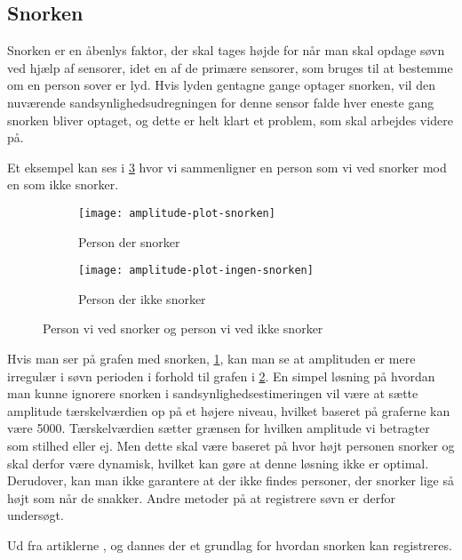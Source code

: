 \subsection{Snorken}\label{section:snorken}
Snorken er en åbenlys faktor, der skal tages højde for når man skal opdage søvn ved hjælp af sensorer, idet en af de primære sensorer, som bruges til at bestemme om en person sover er lyd.
Hvis lyden gentagne gange optager snorken, vil den nuværende sandsynlighedsudregningen for denne sensor falde hver eneste gang snorken bliver optaget, og dette er helt klart et problem, som skal arbejdes videre på.

Et eksempel kan ses i \cref{fig:snorke-vs-ikkesnorken} hvor vi sammenligner en person som vi ved snorker mod en som ikke snorker.

\begin{figure}[h]
\begin{subfigure}{0.49\textwidth}
\texttt{[image: amplitude-plot-snorken]}
\caption{Person der snorker}
\label{fig:person-snorker}
\end{subfigure}
\begin{subfigure}{0.49\textwidth}
\texttt{[image: amplitude-plot-ingen-snorken]}
\caption{Person der ikke snorker}
\label{fig:person-ikke-snorker}
\end{subfigure}
\caption{Person vi ved snorker og person vi ved ikke snorker}
\label{fig:snorke-vs-ikkesnorken}
\end{figure}

Hvis man ser på grafen med snorken, \cref{fig:person-snorker}, kan man se at amplituden er mere irregulær i søvn perioden i forhold til grafen i \cref{fig:person-ikke-snorker}. 
En simpel løsning på hvordan man kunne ignorere snorken i sandsynlighedsestimeringen vil være at sætte amplitude tærskelværdien op på et højere niveau, hvilket baseret på graferne kan være 5000. 
Tærskelværdien sætter grænsen for hvilken amplitude vi betragter som stilhed eller ej.
Men dette skal være baseret på hvor højt personen snorker og skal derfor være dynamisk, hvilket kan gøre at denne løsning ikke er optimal. 
Derudover, kan man ikke garantere at der ikke findes personer, der snorker lige så højt som når de snakker.
Andre metoder på at registrere søvn er derfor undersøgt.

Ud fra artiklerne \citet{Dafna2013}, \citet{Calabrese20111101} og \citet{7051338} dannes der et grundlag for hvordan snorken kan registreres.

